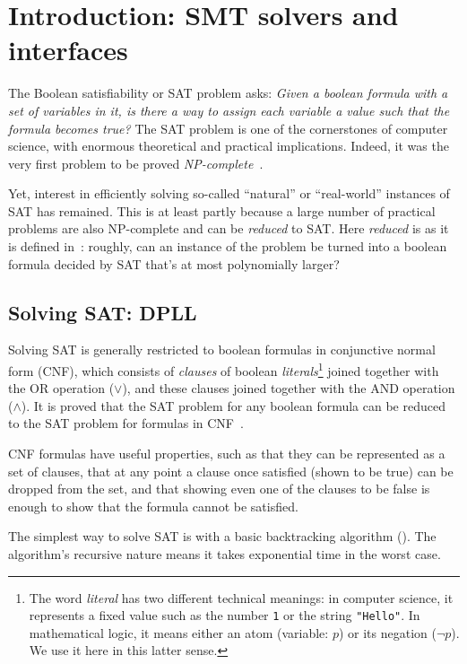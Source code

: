 \chapter{Introduction: SMT solvers and interfaces}
\label{chap:intro}

The Boolean satisfiability or SAT problem asks: \textit{Given a boolean
formula with a set of variables in it, is there a way to assign each variable
a value such that the formula becomes true?} The SAT problem is one of the
cornerstones of computer science, with enormous theoretical and practical
implications. Indeed, it was the very first problem to be proved
\textit{NP-complete}~\cite{sat-npcomplete}.

Yet, interest in efficiently solving so-called ``natural'' or ``real-world''
instances of SAT has remained. This is at least partly because a large number
of practical problems are also NP-complete and can be \textit{reduced} to SAT.
Here \textit{reduced} is as it is defined in~\cite{karp21}: roughly, can an
instance of the problem be turned into a boolean formula decided by SAT that's
at most polynomially larger?

\section{Solving SAT: DPLL}

Solving SAT is generally restricted to boolean formulas in conjunctive normal
form (CNF), which consists of \textit{clauses} of boolean
\textit{literals}\footnote{The word \textit{literal} has two different
technical meanings: in computer science, it represents a fixed value such as
the number \texttt{1} or the string \texttt{"Hello"}. In mathematical logic,
it means either an atom (variable: $p$) or its negation ($\neg p$). We use it
here in this latter sense.} joined together with the OR operation ($\vee$),
and these clauses joined together with the AND operation ($\wedge$). It is
proved that the SAT problem for any boolean formula can be reduced to the SAT
problem for formulas in CNF~\cite{karp21}.

CNF formulas have useful properties, such as that they can be represented as a
set of clauses, that at any point a clause once satisfied (shown to be true)
can be dropped from the set, and that showing even one of the clauses to be
false is enough to show that the formula cannot be satisfied.

The simplest way to solve SAT is with a basic backtracking algorithm
(). The algorithm's recursive nature means it takes
exponential time in the worst case.

